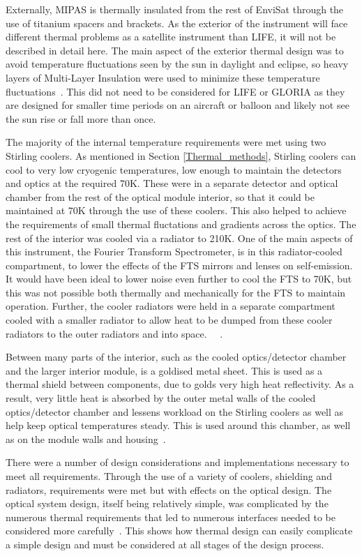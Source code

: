 Externally, MIPAS is thermally insulated from the rest of EnviSat through the use of titanium spacers and brackets. As the exterior of the instrument will face different thermal problems as a satellite instrument than LIFE, it will not be described in detail here. The main aspect of the exterior thermal design was to avoid temperature fluctuations seen by the sun in daylight and eclipse, so heavy layers of Multi-Layer Insulation were used to minimize these temperature fluctuations~\citep{MIPAS_thermal}. This did not need to be considered for LIFE or GLORIA as they are designed for smaller time periods on an aircraft or balloon and likely not see the sun rise or fall more than once. 

The majority of the internal temperature requirements were met using two Stirling coolers. As mentioned in Section \ref{Thermal_methods}, Stirling coolers can cool to very low cryogenic temperatures, low enough to maintain the detectors and optics at the required 70K. These were in a separate detector and optical chamber from the rest of the optical module interior, so that it could be maintained at 70K through the use of these coolers. This also helped to achieve the requirements of small thermal fluctations and gradients across the optics. The rest of the interior was cooled via a radiator to 210K. One of the main aspects of this instrument, the Fourier Transform Spectrometer, is in this radiator-cooled compartment, to lower the effects of the FTS mirrors and lenses on self-emission. It would have been ideal to lower noise even further to cool the FTS to 70K, but this was not possible both thermally and mechanically for the FTS to maintain operation. Further, the cooler radiators were held in a separate compartment cooled with a smaller radiator to allow heat to be dumped from these cooler radiators to the outer radiators and into space. ~\citep{MIPAS_instrument}~\citep{MIPAS_thermal}.

Between many parts of the interior, such as the cooled optics/detector chamber and the larger interior module, is a goldised metal sheet. This is used as a thermal shield between components, due to golds very high heat reflectivity. As a result, very little heat is absorbed by the outer metal walls of the cooled optics/detector chamber and lessens workload on the Stirling coolers as well as help keep optical temperatures steady. This is used around this chamber, as well as on the module walls and housing~\citep{MIPAS_thermal}.

There were a number of design considerations and implementations necessary to meet all requirements. Through the use of a variety of coolers, shielding and radiators, requirements were met but with effects on the optical design. The optical system design, itself being relatively simple, was complicated by the numerous thermal requirements that led to numerous interfaces needed to be considered more carefully~\citep{MIPAS_instrument}. This shows how thermal design can easily complicate a simple design and must be considered at all stages of the design process.

